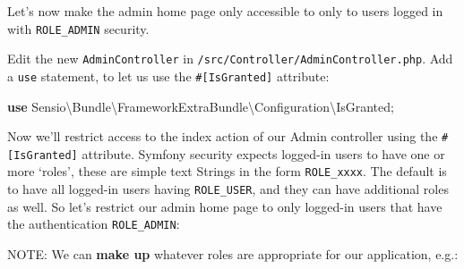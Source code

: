 \documentclass[a4paperpaper,openright]{book}
\newenvironment{Shaded}{}{}
\newcommand{\CommentTok}[1]{\textcolor[rgb]{0.38,0.63,0.69}{\textit{#1}}}
\newcommand{\KeywordTok}[1]{\textcolor[rgb]{0.00,0.44,0.13}{\textbf{#1}}}
\newcommand{\NormalTok}[1]{#1}
\newcommand{\OtherTok}[1]{\textcolor[rgb]{0.00,0.44,0.13}{#1}}
\newcommand{\StringTok}[1]{\textcolor[rgb]{0.25,0.44,0.63}{#1}}
\begin{document}
Let's now make the admin home page only accessible to only to users
logged in with \texttt{ROLE\_ADMIN} security.

Edit the new \texttt{AdminController} in
\texttt{/src/Controller/AdminController.php}. Add a \texttt{use}
statement, to let us use the \texttt{\#{[}IsGranted{]}} attribute:

\begin{Shaded}
\begin{Highlighting}[]
    \KeywordTok{use}\NormalTok{ Sensio\textbackslash{}Bundle\textbackslash{}FrameworkExtraBundle\textbackslash{}Configuration\textbackslash{}IsGranted}\OtherTok{;}
\end{Highlighting}
\end{Shaded}

Now we'll restrict access to the index action of our Admin controller
using the \texttt{\#{[}IsGranted{]}} attribute. Symfony security expects
logged-in users to have one or more `roles', these are simple text
Strings in the form \texttt{ROLE\_xxxx}. The default is to have all
logged-in users having \texttt{ROLE\_USER}, and they can have additional
roles as well. So let's restrict our admin home page to only logged-in
users that have the authentication \texttt{ROLE\_ADMIN}:

\begin{Shaded}
\end{Shaded}

NOTE: We can \textbf{make up} whatever roles are appropriate for our
application, e.g.:
\end{document}
